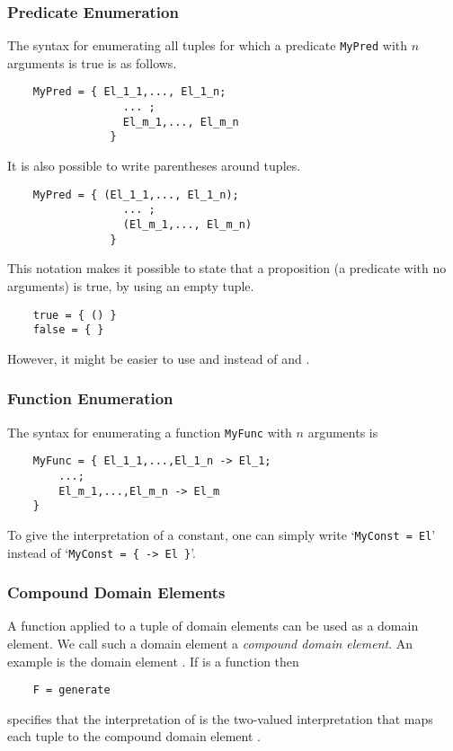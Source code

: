 \documentclass[a4]{article}
\begin{document}
\subsubsection{Predicate Enumeration}
The syntax for enumerating all tuples for which a predicate {\tt MyPred} with $n$ arguments is true is as follows.
\begin{lstlisting}
	MyPred = { El_1_1,..., El_1_n; 
				  ... ; 
				  El_m_1,..., El_m_n 
				}
\end{lstlisting}

It is also possible to write parentheses around tuples.
\begin{lstlisting}
	MyPred = { (El_1_1,..., El_1_n); 
				  ... ; 
				  (El_m_1,..., El_m_n) 
				}
\end{lstlisting}
This notation makes it possible to state that a proposition (a predicate with no arguments) is true, by using an empty tuple.
\begin{lstlisting}
	true = { () }
	false = { }
\end{lstlisting}
However, it might be easier to use  and  instead of \code{\{ () \}} and \code{\{\}}.

\subsubsection{Function Enumeration}
The syntax for enumerating a function {\tt MyFunc} with $n$ arguments is 
\begin{lstlisting}
	MyFunc = { El_1_1,...,El_1_n -> El_1;
		...;
		El_m_1,...,El_m_n -> El_m
	}
\end{lstlisting}
To give the interpretation of a constant, one can simply write `{\tt MyConst = El}' instead of `{\tt MyConst = \{ -> El \}}'.

\subsubsection{Compound Domain Elements}
A function applied to a tuple of domain elements can be used as a domain element.  We call such a domain element a \textit{compound domain element}.  An example is the domain element . If  is a function then 
\begin{lstlisting}
	F = generate
\end{lstlisting}
specifies that the interpretation of  is the two-valued interpretation that maps each tuple  to the compound domain element .
\end{document}
